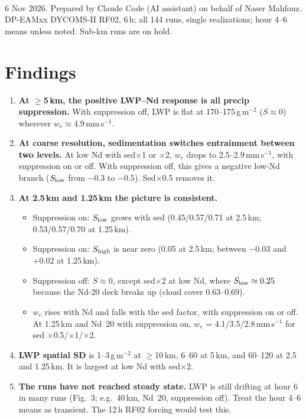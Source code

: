\documentclass[10pt]{article}
\begin{document}
\sloppy
{}\\[2pt]
6 Nov 2026. Prepared by Claude Code (AI assistant) on behalf of Naser Mahfouz.
DP-EAMxx DYCOMS-II RF02, 6\,h; all 144 runs, single realizations; hour 4--6 means unless noted. Sub-km runs are on hold.

\section*{Findings}
\begin{enumerate}
\item \textbf{At $\geq$5\,km, the positive LWP--Nd response is all precip suppression.} With suppression off, LWP is flat at
170--175\,g\,m$^{-2}$ ($S\approx0$) wherever $w_e\approx4.9$\,mm\,s$^{-1}$.
\item \textbf{At coarse resolution, sedimentation switches entrainment between two levels.} At low Nd with sed$\times$1 or $\times$2,
$w_e$ drops to 2.5--2.9\,mm\,s$^{-1}$, with suppression on or off. With suppression off, this gives a negative low-Nd branch
($S_{\rm low}$ from $-0.3$ to $-0.5$). Sed$\times$0.5 removes it.
\item \textbf{At 2.5\,km and 1.25\,km the picture is consistent.}
\begin{itemize}
\item Suppression on: $S_{\rm low}$ grows with sed (0.45/0.57/0.71 at 2.5\,km; 0.53/0.57/0.70 at 1.25\,km).
\item Suppression on: $S_{\rm high}$ is near zero (0.05 at 2.5\,km; between $-0.03$ and $+0.02$ at 1.25\,km).
\item Suppression off: $S\approx0$, except sed$\times$2 at low Nd, where $S_{\rm low}\approx0.25$ because the Nd-20 deck breaks up (cloud cover 0.63--0.69).
\item $w_e$ rises with Nd and falls with the sed factor, with suppression on or off. At 1.25\,km and Nd~20 with suppression on, $w_e$ = 4.1/3.5/2.8\,mm\,s$^{-1}$ for sed $\times$0.5/$\times$1/$\times$2.
\end{itemize}
\item \textbf{LWP spatial SD} is 1--3\,g\,m$^{-2}$ at $\geq$10\,km, 6--60 at 5\,km, and 60--120 at 2.5 and 1.25\,km. It is largest at low Nd with sed$\times$2.
\item \textbf{The runs have not reached steady state.} LWP is still drifting at hour 6 in many runs (Fig.~3; e.g.\ 40\,km, Nd~20, suppression off).
Treat the hour 4--6 means as transient. The 12\,h RF02 forcing would test this.
\end{enumerate}
\end{document}
